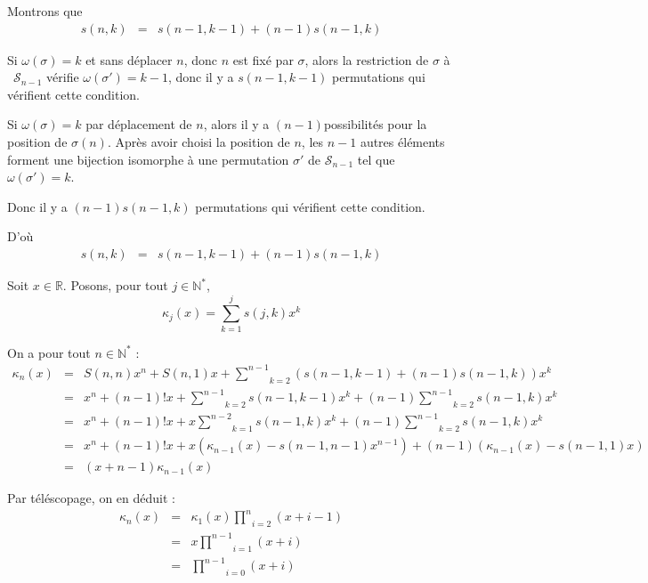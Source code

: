 Montrons que
\begin{eqnarray*}
  s (n, k) & = & s (n - 1, k - 1) + (n - 1) s (n - 1, k)
\end{eqnarray*}


Si $\omega (\sigma) = k$ et sans d{\'e}placer $n$, donc $n$ est fix{\'e} par
$\sigma$, alors la restriction de $\sigma$ {\`a} \ $\mathcal{S}_{n - 1} $
v{\'e}rifie $\omega (\sigma') = k - 1$, donc il y a $s (n - 1, k - 1)$
permutations qui v{\'e}rifient cette condition.

Si $\omega (\sigma) = k$ par d{\'e}placement de $n$, alors il y a $(n - 1)
$possibilit{\'e}s pour la position de $\sigma (n)$. Apr{\`e}s avoir choisi la
position de $n$, les $n - 1$ autres {\'e}l{\'e}ments forment une bijection
isomorphe {\`a} une permutation $\sigma'$ de $\mathcal{S}_{n - 1}$ tel que
$\omega (\sigma') = k$.

Donc il y a $(n - 1) s (n - 1, k)$ permutations qui v{\'e}rifient cette
condition.

D'o{\`u}
\[ \begin{array}{lll}
     s (n, k) & = & s (n - 1, k - 1) + (n - 1) s (n - 1, k)
   \end{array} \]


 Soit $x \in \mathbb{R}$. Posons, pour tout $j \in
\mathbb{N}^{\ast}$,
\[ \kappa_j (x) = \underset{k = 1}{\overset{j}{\sum}} s (j, k) x^k \]


On a pour tout $n \in \mathbb{N}^{\ast}$ :
\begin{eqnarray*}
  \kappa_n (x) & = & S (n, n) x^n + S (n, 1) x + \underset{k = 2}{\overset{n -
  1}{\sum}} (s (n - 1, k - 1) + (n - 1) s (n - 1, k)) x^k\\
  & = & x^n + (n - 1) !x + \underset{k = 2}{\overset{n - 1}{\sum}} s (n - 1,
  k - 1) x^k + (n - 1) \underset{k = 2}{\overset{n - 1}{\sum}} s (n - 1, k)
  x^k\\
  & = & x^n + (n - 1) !x + x \underset{k = 1}{\overset{n - 2}{\sum}} s (n -
  1, k) x^k + (n - 1) \underset{k = 2}{\overset{n - 1}{\sum}} s (n - 1, k)
  x^k\\
  & = & x^n + (n - 1) !x + x (\kappa_{n - 1} (x) - s (n - 1, n - 1) x^{n -
  1}) + (n - 1) (\kappa_{n - 1} (x) - s (n - 1, 1) x)\\
  & = & (x + n - 1) \kappa_{n - 1} (x)
\end{eqnarray*}


Par t{\'e}l{\'e}scopage, on en d{\'e}duit :
\begin{eqnarray*}
  \kappa_n (x) & = & \kappa_1 (x) \underset{i = 2}{\overset{n}{\prod}} (x + i
  - 1)\\
  & = & x \underset{i = 1}{\overset{n - 1}{\prod}} (x + i)\\
  & = & \underset{i = 0}{\overset{n - 1}{\prod}} (x + i)
\end{eqnarray*}


